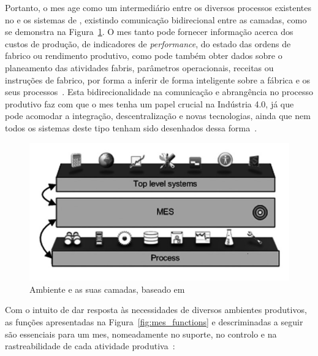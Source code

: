 Portanto, o \gls{mes} age como um intermediário entre os diversos processos existentes no  e os sistemas de , existindo comunicação bidirecional entre as camadas, como se demonstra na Figura~\ref{fig:mes_layers}. O \gls{mes} tanto pode fornecer informação acerca dos custos de produção, de indicadores de \textit{performance}, do estado das ordens de fabrico ou rendimento produtivo, como pode também obter dados sobre o planeamento das atividades fabris, parâmetros operacionais, receitas ou instruções de fabrico, por forma a inferir de forma inteligente sobre a fábrica e os seus processos~\parencite{mes_explained_high_level_vision}. Esta bidirecionalidade na comunicação e abrangência no processo produtivo faz com que o \gls{mes} tenha um papel crucial na Indústria 4.0, já que pode acomodar a integração, descentralização e novas tecnologias, ainda que nem todos os sistemas deste tipo tenham sido desenhados dessa forma~\parencite{cmf_mes_definition}.
%
\begin{figure}
    \centering
    \includegraphics[width=.8\textwidth]{ch02/assets/mes_layers.jpg}
    \caption{Ambiente  e as suas camadas, baseado em~\textcite[p.~526]{mes_literature_review}}
    \label{fig:mes_layers}
\end{figure}

Com o intuito de dar resposta às necessidades de diversos ambientes produtivos, as funções apresentadas na Figura~\ref{fig:mes_functions} e descriminadas a seguir são essenciais para um \gls{mes}, nomeadamente no suporte, no controlo e na rastreabilidade de cada atividade produtiva~\parencite{mes_literature_review, mes_explained_high_level_vision, introduction_mes}:

